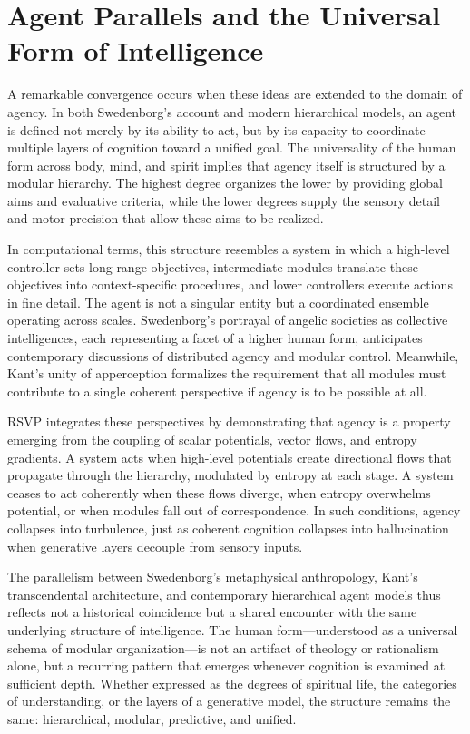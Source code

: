 \documentclass[12pt]{article}
\begin{document}
\section{Agent Parallels and the Universal Form of Intelligence}

A remarkable convergence occurs when these ideas are extended to the domain of 
agency. In both Swedenborg’s account and modern hierarchical models, an agent is 
defined not merely by its ability to act, but by its capacity to coordinate 
multiple layers of cognition toward a unified goal. The universality of the 
human form across body, mind, and spirit implies that agency itself is 
structured by a modular hierarchy. The highest degree organizes the lower by 
providing global aims and evaluative criteria, while the lower degrees supply 
the sensory detail and motor precision that allow these aims to be realized.

In computational terms, this structure resembles a system in which a high-level 
controller sets long-range objectives, intermediate modules translate these 
objectives into context-specific procedures, and lower controllers execute 
actions in fine detail. The agent is not a singular entity but a coordinated 
ensemble operating across scales. Swedenborg’s portrayal of angelic societies 
as collective intelligences, each representing a facet of a higher human form, 
anticipates contemporary discussions of distributed agency and modular control.  
Meanwhile, Kant’s unity of apperception formalizes the requirement that all 
modules must contribute to a single coherent perspective if agency is to be 
possible at all.

RSVP integrates these perspectives by demonstrating that agency is a property 
emerging from the coupling of scalar potentials, vector flows, and entropy 
gradients. A system acts when high-level potentials create directional flows 
that propagate through the hierarchy, modulated by entropy at each stage.  
A system ceases to act coherently when these flows diverge, when entropy 
overwhelms potential, or when modules fall out of correspondence. In such 
conditions, agency collapses into turbulence, just as coherent cognition 
collapses into hallucination when generative layers decouple from sensory 
inputs.

The parallelism between Swedenborg's metaphysical anthropology, Kant’s 
transcendental architecture, and contemporary hierarchical agent models thus 
reflects not a historical coincidence but a shared encounter with the same 
underlying structure of intelligence. The human form—understood as a universal 
schema of modular organization—is not an artifact of theology or rationalism 
alone, but a recurring pattern that emerges whenever cognition is examined at 
sufficient depth. Whether expressed as the degrees of spiritual life, the 
categories of understanding, or the layers of a generative model, the structure 
remains the same: hierarchical, modular, predictive, and unified.
\end{document}
